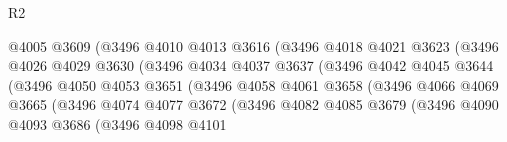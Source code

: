 \begin{lexlean}{R2}
\begin{coremodule}
                                    @4005
                                    @3609
                                    (@3496
                                      @4010
                                      @4013
                                      @3616
                                      (@3496
                                        @4018
                                        @4021
                                        @3623
                                        (@3496
                                          @4026
                                          @4029
                                          @3630
                                          (@3496
                                            @4034
                                            @4037
                                            @3637
                                            (@3496
                                              @4042
                                              @4045
                                              @3644
                                              (@3496
                                                @4050
                                                @4053
                                                @3651
                                                (@3496
                                                  @4058
                                                  @4061
                                                  @3658
                                                  (@3496
                                                    @4066
                                                    @4069
                                                    @3665
                                                    (@3496
                                                      @4074
                                                      @4077
                                                      @3672
                                                      (@3496
                                                        @4082
                                                        @4085
                                                        @3679
                                                        (@3496
                                                          @4090
                                                          @4093
                                                          @3686
                                                          (@3496
                                                            @4098
                                                            @4101

\end{coremodule}
\end{lexlean}
